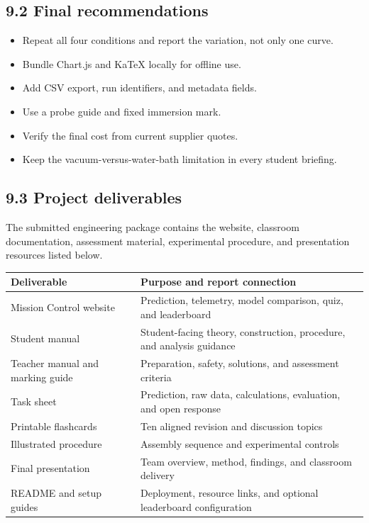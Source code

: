 \documentclass[10pt,conference,a4paper]{IEEEtran}
\begin{document}
\subsection*{9.2 Final recommendations}

\begin{itemize}[leftmargin=*,nosep]

\item Repeat all four conditions and report the variation, not only one curve.

\item Bundle Chart.js and KaTeX locally for offline use.

\item Add CSV export, run identifiers, and metadata fields.

\item Use a probe guide and fixed immersion mark.

\item Verify the final cost from current supplier quotes.

\item Keep the vacuum-versus-water-bath limitation in every student briefing.

\end{itemize}

\subsection*{9.3 Project deliverables}

The submitted engineering package contains the website, classroom documentation, assessment material, experimental procedure, and presentation resources listed below.

\begin{center}\footnotesize
\setlength{\tabcolsep}{2.5pt}
\renewcommand{\arraystretch}{1.14}
\begin{tabular}{>{\raggedright\arraybackslash}p{}>{\raggedright\arraybackslash}p{}}
\toprule
\textbf{Deliverable} & \textbf{Purpose and report connection} \\
\midrule
Mission Control website & Prediction, telemetry, model comparison, quiz, and leaderboard \\
Student manual & Student-facing theory, construction, procedure, and analysis guidance \\
Teacher manual and marking guide & Preparation, safety, solutions, and assessment criteria \\
Task sheet & Prediction, raw data, calculations, evaluation, and open response \\
Printable flashcards & Ten aligned revision and discussion topics \\
Illustrated procedure & Assembly sequence and experimental controls \\
Final presentation & Team overview, method, findings, and classroom delivery \\
README and setup guides & Deployment, resource links, and optional leaderboard configuration \\
\bottomrule
\end{tabular}
\end{center}
\end{document}
